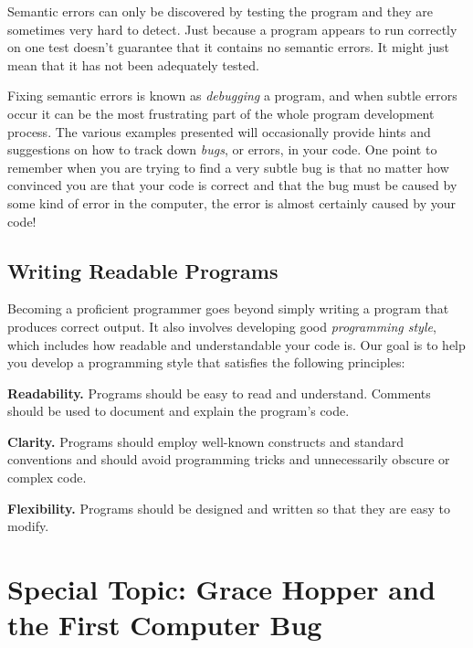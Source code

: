 Semantic errors can only be discovered by testing the program and they
are sometimes very hard to detect. Just because a program appears to
run correctly on one test doesn't guarantee that it contains no
semantic errors. It might just mean that it has not been adequately
tested.

Fixing semantic errors is known as {\it debugging} a program, and when
subtle errors occur it can be the most frustrating part of the whole
program development process.  The various examples presented will
occasionally provide hints and suggestions on how to track down {\it
bugs}, or errors, in your code.  One point to remember when you are
trying to find a very subtle bug is that no matter how convinced you
are that your code is correct and that the bug must be caused by some
kind of error in the computer, the error is almost certainly caused by
your code!

\subsection{Writing Readable Programs}
\noindent Becoming a proficient programmer goes beyond 
simply writing a program that produces correct output.   It also involves 
developing good {\it programming style}, which includes how readable
and understandable your code is.  Our goal is to help you develop a
programming style that satisfies the following principles:

\begin{BL}
\item  {\bf Readability.}
Programs should be easy to read and understand.  Comments should
be used to document and explain the program's code.

\item  {\bf Clarity.}
Programs should employ well-known constructs and standard conventions
and should avoid programming tricks and unnecessarily obscure or
complex code.

\item  {\bf Flexibility.}
Programs should be designed and written so that they are easy to modify.
\end{BL}

\section*{{\color{cyan}Special Topic:} Grace Hopper and \\
\hspace*{20pt}the First Computer Bug}

